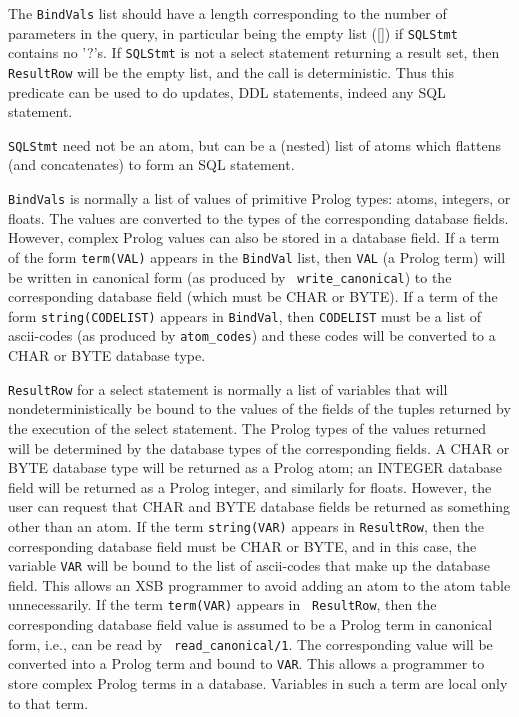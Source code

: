 The {\tt BindVals} list should have a length corresponding to the
number of parameters in the query, in particular being the empty list
([]) if {\tt SQLStmt} contains no '?'s.  If {\tt SQLStmt} is not a
select statement returning a result set, then {\tt ResultRow} will be the
empty list, and the call is deterministic.  Thus this predicate can be
used to do updates, DDL statements, indeed any SQL statement.

{\tt SQLStmt} need not be an atom, but can be a (nested) list of atoms
which flattens (and concatenates) to form an SQL statement.

{\tt BindVals} is normally a list of values of primitive Prolog types:
atoms, integers, or floats.  The values are converted to the types of
the corresponding database fields.  However, complex Prolog values can
also be stored in a database field.  If a term of the form
{\tt term(VAL)} appears in the {\tt BindVal} list, then {\tt VAL} (a
Prolog term) will be written in canonical form (as produced by {\tt
write\_canonical}) to the corresponding database field (which must be
CHAR or BYTE).  If a term of the form {\tt string(CODELIST)} appears
in {\tt BindVal}, then {\tt CODELIST} must be a list of ascii-codes
(as produced by {\tt atom\_codes}) and these codes will be converted
to a CHAR or BYTE database type.

{\tt ResultRow} for a select statement is normally a list of variables
that will nondeterministically be bound to the values of the fields of
the tuples returned by the execution of the select statement.  The
Prolog types of the values returned will be determined by the database
types of the corresponding fields.  A CHAR or BYTE database type will
be returned as a Prolog atom; an INTEGER database field will be
returned as a Prolog integer, and similarly for floats.  However, the
user can request that CHAR and BYTE database fields be returned as
something other than an atom.  If the term {\tt string(VAR)} appears
in {\tt ResultRow}, then the corresponding database field must be CHAR
or BYTE, and in this case, the variable {\tt VAR} will be bound to the
list of ascii-codes that make up the database field.  This allows an
XSB programmer to avoid adding an atom to the atom table
unnecessarily.  If the term {\tt term(VAR)} appears in {\tt
ResultRow}, then the corresponding database field value is assumed to
be a Prolog term in canonical form, i.e., can be read by {\tt
read\_canonical/1}.  The corresponding value will be converted into a
Prolog term and bound to {\tt VAR}.  This allows a programmer to store
complex Prolog terms in a database.  Variables in such a term are
local only to that term.

